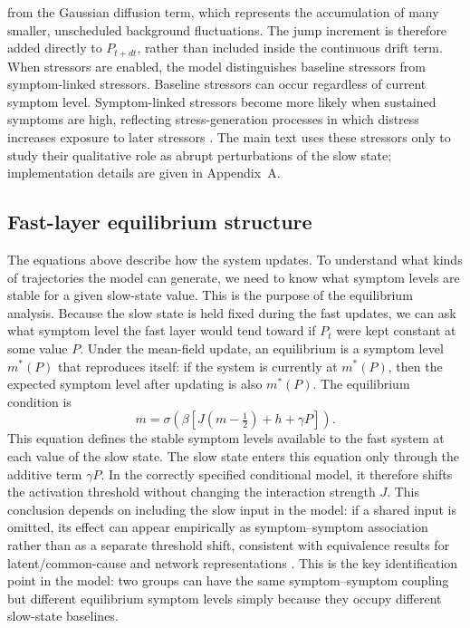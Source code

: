 \documentclass[man,12pt,floatsintext]{apa7}
\begin{document}
from the Gaussian diffusion term, which represents the accumulation of many smaller,
unscheduled background fluctuations. The jump increment is therefore added directly to
\(P_{t+dt}\), rather than included inside the continuous drift term. When stressors are
enabled, the model distinguishes baseline stressors from symptom-linked stressors. Baseline
stressors can occur regardless of current symptom level. Symptom-linked stressors become
more likely when sustained symptoms are high, reflecting stress-generation processes in
which distress increases exposure to later stressors
\parencite{hammen2006stress,liu2010stress,rnic2023vicious}. The main text uses these
stressors only to study their qualitative role as abrupt perturbations of the slow state;
implementation details are given in Appendix~A.
\subsection{Fast-layer equilibrium structure}
The equations above describe how the system updates. To understand what kinds of trajectories the model can generate, we need to know what symptom levels are stable for a given slow-state value. This is the purpose of the equilibrium analysis.
Because the slow state is held fixed during the fast updates, we can ask what symptom level the fast layer would tend toward if \(P_t\) were kept constant at some value \(P\). Under the mean-field update, an equilibrium is a symptom level \(m^\ast(P)\) that reproduces itself: if the system is currently at \(m^\ast(P)\), then the expected symptom level after updating is also \(m^\ast(P)\). The equilibrium condition is
\begin{equation}
m=\sigma\!\left(\beta\left[J\left(m-\tfrac12\right)+h+\gamma P\right]\right).
\label{eq:fixedpoint}
\end{equation}
This equation defines the stable symptom levels available to the fast system at each value of the slow state.
The slow state enters this equation only through the additive term \(\gamma P\). In the correctly specified conditional model, it therefore shifts the activation threshold without changing the interaction strength \(J\). This conclusion depends on including the slow input in the model: if a shared input is omitted, its effect can appear empirically as symptom--symptom association rather than as a separate threshold shift, consistent with equivalence results for latent/common-cause and network representations \parencite{kruis2016three,marsman2018introduction,van2021latent}. This is the key identification point in the model: two groups can have the same symptom--symptom coupling but different equilibrium symptom levels simply because they occupy different slow-state baselines.
\end{document}
